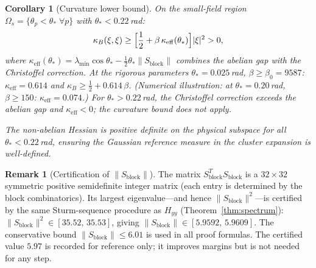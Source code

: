 \documentclass[11pt]{article}
\newtheorem{corollary}[theorem]{Corollary}
\theoremstyle{definition}
\newtheorem{remark}[theorem]{Remark}
\begin{document}
\begin{corollary}[Curvature lower bound]\label{cor:curvature}
On the small-field region $\Omega_s=\{\theta_p<\theta_*\;\forall p\}$
with $\theta_*<0.22$\,rad:
\begin{equation}\label{eq:kappa}
\kappa_B(\xi,\xi)
\ge\Bigl[\frac{1}{2}+\beta\,\kappa_{\mathrm{eff}}(\theta_*)\Bigr]|\xi|^2
>0,
\end{equation}
where $\kappa_{\mathrm{eff}}(\theta_*)
=\lambda_{\min}\cos\theta_*-\tfrac{1}{2}\theta_*\|S_{\mathrm{block}}\|$
combines the abelian gap with the Christoffel correction.
At the rigorous parameters $\theta_*=0.025$\,rad,
$\beta\ge\beta_0=9587$:
$\kappa_{\mathrm{eff}}=0.614$
and $\kappa_B\ge\frac{1}{2}+0.614\,\beta$.
\emph{(Numerical illustration:
at $\theta_*=0.20$\,rad, $\beta\ge 150$:
$\kappa_{\mathrm{eff}}=0.074$.)}
For $\theta_*>0.22$\,rad, the Christoffel correction exceeds the
abelian gap and $\kappa_{\mathrm{eff}}<0$; the curvature bound does
not apply.

The non-abelian Hessian is positive definite on the physical
subspace for all $\theta_*<0.22$\,rad, ensuring the Gaussian
reference measure in the cluster expansion is well-defined.
\end{corollary}

\begin{remark}[Certification of $\|S_{\mathrm{block}}\|$]%
\label{rem:sblock-cert}
The matrix $S_{\mathrm{block}}^TS_{\mathrm{block}}$ is a
$32\times 32$ symmetric positive semidefinite integer
matrix (each entry is determined by the block combinatorics).
Its largest eigenvalue---and hence $\|S_{\mathrm{block}}\|^2$---is
certified by the same Sturm-sequence procedure as $H_{yy}$
(Theorem~\ref{thm:spectrum}):
$\|S_{\mathrm{block}}\|^2\in[35.52,\,35.53]$,
giving $\|S_{\mathrm{block}}\|\in[5.9592,\,5.9609]$.
The conservative bound $\|S_{\mathrm{block}}\|\le 6.01$ is
used in all proof formulas.
The certified value $5.97$ is recorded for reference only;
it improves margins but is not needed for any step.
\end{remark}
\end{document}
